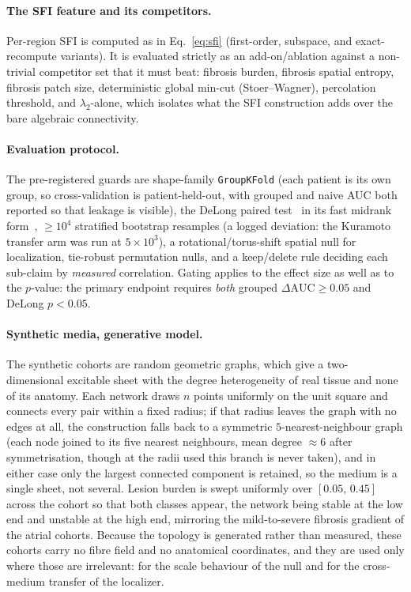\documentclass[11pt]{article}
\theoremstyle{definition}
\newcommand{\lam}{\lambda}
\newcommand{\dAUC}{\Delta\mathrm{AUC}}
\newcommand{\code}[1]{\texttt{#1}}
\begin{document}
\paragraph{The SFI feature and its competitors.} Per-region SFI is computed as
in Eq.~\eqref{eq:sfi} (first-order, subspace, and exact-recompute variants). It
is evaluated strictly as an add-on/ablation against a non-trivial competitor set
that it must beat: fibrosis burden, fibrosis spatial entropy, fibrosis patch
size, deterministic global min-cut (Stoer--Wagner), percolation threshold, and
$\lam_2$-alone, which isolates what the SFI construction adds over the bare
algebraic connectivity.

\paragraph{Evaluation protocol.} The pre-registered guards are shape-family
\code{GroupKFold} (each patient is its own group, so cross-validation is
patient-held-out, with grouped and naive AUC both reported so that leakage is
visible), the DeLong paired test~\cite{delong1988} in its fast midrank
form~\cite{sunxu2014}, $\geq 10^4$ stratified bootstrap resamples (a logged
deviation: the Kuramoto transfer arm was run at $5\times10^3$), a
rotational/torus-shift spatial null for localization, tie-robust permutation
nulls, and a keep/delete rule deciding each sub-claim by \emph{measured}
correlation. Gating applies to the effect size as well as to the $p$-value: the
primary endpoint requires \emph{both} grouped $\dAUC\geq 0.05$ and DeLong
$p<0.05$.

\paragraph{Synthetic media, generative model.} The synthetic cohorts are random
geometric graphs, which give a two-dimensional excitable sheet with the
degree heterogeneity of real tissue and none of its anatomy. Each network draws
$n$ points uniformly on the unit square and connects every pair within a fixed
radius; if that radius leaves the graph with no edges at all, the construction
falls back to a symmetric $5$-nearest-neighbour graph (each node joined to its
five nearest neighbours, mean degree $\approx 6$ after symmetrisation, though at
the radii used this branch is never taken), and in either case only the largest
connected component is retained, so the medium is a single sheet, not
several. Lesion burden is swept uniformly over $[0.05,\,0.45]$ across the cohort
so that both classes appear, the network being stable at the low end and unstable
at the high end, mirroring the mild-to-severe fibrosis gradient of the
atrial cohorts. Because the topology is generated rather than measured, these
cohorts carry no fibre field and no anatomical coordinates, and they are used
only where those are irrelevant: for the scale behaviour of the null and for
the cross-medium transfer of the localizer.
\end{document}
